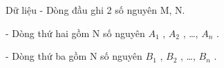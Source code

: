Dữ liệu
- Dòng đầu ghi 2 số nguyên M, N.  

   - Dòng thứ hai gồm N số nguyên $A_{1}$   , $A_{2}$   , …, $A_{n}$   .  

   - Dòng thứ ba gồm N số nguyên $B_{1}$   , $B_{2}$   , …, $B_{n}$   .